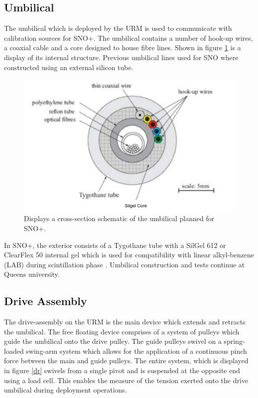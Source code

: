 \documentclass[paper=a4, fontsize=11pt]{scrartcl}
\numberwithin{equation}{section}		%
\numberwithin{figure}{section}			%
\numberwithin{table}{section}				%
\begin{document}
\subsection{Umbilical}
The umbilical which is deployed by the URM is used to communicate with calibration sources for SNO+. The umbilical contains a number of hook-up wires, a coaxial cable and a core designed to house fibre lines. Shown in figure \ref{umb} is a display of its internal structure. Previous umbilical lines used for SNO where constructed using an external silicon tube. 
\begin{figure}[h!]
\centering
\includegraphics[width=0.65\linewidth]{umb}
\caption{Displays a cross-section schematic of the umbilical planned for SNO+. \cite{picfsk}}
\label{umb}
\end{figure}
 In SNO+, the exterior consists of a Tygothane tube with a SilGel 612 or ClearFlex 50 internal gel which is used for compatibility with linear alkyl-benzene (LAB) during scintillation phase \cite{picfsk}. Umbilical construction and tests continue at Queens university.
\subsection{Drive Assembly}
The drive-assembly on the URM is the main device which extends and retracts the umbilical. The free floating device comprises of a system of pulleys which guide the umbilical onto the drive pulley. The guide pulleys swivel on a spring-loaded swing-arm system which allows for the application of a continuous pinch force between the main and guide pulleys. The entire system, which is displayed in figure \ref{dr} swivels from a single pivot and is suspended at the opposite end using a load cell. This enables the measure of the tension exerted onto the drive umbilical during deployment operations. 
\end{document}
